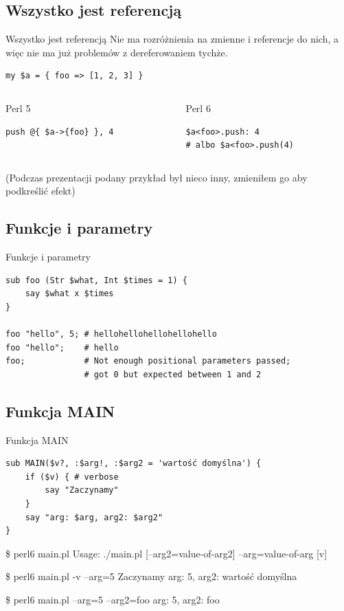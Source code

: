 \documentclass{beamer}
\begin{document}
			\subsection{Wszystko jest referencją}
\begin{frame}[fragile]{Wszystko jest referencją}
	Nie ma rozróżnienia na zmienne i referencje do nich,
	a więc nie ma już problemów z dereferowaniem tychże.
	\begin{verbatim}
my $a = { foo => [1, 2, 3] }
	\end{verbatim}
	\begin{columns}[t]
		\begin{column}{0.5\textwidth}
			\begin{block}{Perl 5}
				\begin{verbatim}
push @{ $a->{foo} }, 4
				\end{verbatim}
			\end{block}
		\end{column}
		\begin{column}{0.5\textwidth}
			\begin{block}{Perl 6}
				\begin{verbatim}
$a<foo>.push: 4
# albo $a<foo>.push(4)
				\end{verbatim}
			\end{block}
		\end{column}
	\end{columns}
{\scriptsize(Podczas prezentacji podany przykład był nieco inny,
zmieniłem go aby podkreślić efekt)}
\end{frame}
			\subsection{Funkcje i parametry}
\begin{frame}[fragile]{Funkcje i parametry}
	\begin{verbatim}
sub foo (Str $what, Int $times = 1) {
    say $what x $times
}

foo "hello", 5; # hellohellohellohellohello
foo "hello";    # hello
foo;            # Not enough positional parameters passed;
                # got 0 but expected between 1 and 2
	\end{verbatim}
\end{frame}
			\subsection{Funkcja MAIN}
\begin{frame}[fragile]{Funkcja MAIN}
\small
\begin{verbatim}
sub MAIN($v?, :$arg!, :$arg2 = 'wartość domyślna') {
    if ($v) { # verbose
        say "Zaczynamy"
    }
    say "arg: $arg, arg2: $arg2"
}
\end{verbatim}
\begin{semiverbatim}
\$ \alert{perl6 main.pl}
Usage:
./main.pl [--arg2=value-of-arg2] --arg=value-of-arg [v]

\$ \alert{perl6 main.pl -v --arg=5}
Zaczynamy
arg: 5, arg2: wartość domyślna

\$ \alert{perl6 main.pl --arg=5 --arg2=foo}
arg: 5, arg2: foo
\end{semiverbatim}
\end{frame}
\end{document}
